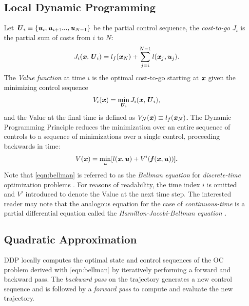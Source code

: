 \subsection{Local Dynamic Programming}
Let $\bm{\mathit{U}}_i\equiv\{\bm{\mathit{u}}_i,\bm{\mathit{u}}_{i+1}...,\bm{\mathit{u}}_{N-1}\}$ be the partial control sequence, the \textit{cost-to-go} $J_i$ is the partial sum of costs from $i$ to $N$: 
\begin{equation}\label{eqn:costToGo}
J_i(\bm{\mathit{x}}, \bm{\mathit{U}}_i)=l_f(\bm{\mathit{x}}_N)+\sum_{j=i}^{N-1}l(\bm{\mathit{x}}_j,\bm{\mathit{u}}_j).
\end{equation}
The \textit{Value function} at time $i$ is the optimal cost-to-go starting at $\bm{\mathit{x}}$ given the minimizing control sequence 
\begin{equation*}\label{eqn:value}
V_i(\bm{\mathit{x}})=\min_{\bm{\mathit{U}}_i}J_i(\bm{\mathit{x}}, \bm{\mathit{U}}_i),
\end{equation*}
and the Value at the final time is defined as $V_N(\bm{\mathit{x}})\equiv l_f(\bm{\mathit{x}}_N)$. The Dynamic Programming Principle \citep{bellman1966dynamic} reduces the minimization over an entire sequence of controls to a sequence of minimizations over a single control, proceeding backwards in time: 
\begin{equation}\label{eqn:bellman}
V(\bm{\mathit{x}})=\min_{\bm{\mathit{u}}}[l(\bm{\mathit{x}}, \bm{\mathit{u}})+V'(\bm{\mathit{f}}(\bm{\mathit{x}},\bm{\mathit{u}}))].
\end{equation}
Note that \cref{eqn:bellman} is referred to as the \textit{Bellman equation} for \textit{discrete-time} optimization problems \citep{kirk2004optimal}. For reasons of readability, the time index $i$ is omitted and $V'$ introduced to denote the Value at the next time step. The interested reader may note that the analogous equation for the case of \textit{continuous-time} is a partial differential equation called the \textit{Hamilton-Jacobi-Bellman equation} \citep{underactuatedCourse2020, kamien2012dynamic}.

\subsection{Quadratic Approximation}
\gls{DDP} locally computes the optimal state and control sequences of the \gls{OC} problem derived with \cref{eqn:bellman} by iteratively performing a forward and backward pass. The \textit{backward pass} on the trajectory generates a new control sequence and is followed by a \textit{forward pass} to compute and evaluate the new trajectory.

